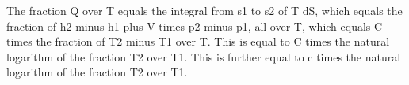 The fraction Q over T equals the integral from s1 to s2 of T dS, which equals the fraction of h2 minus h1 plus V times p2 minus p1, all over T, which equals C times the fraction of T2 minus T1 over T. This is equal to C times the natural logarithm of the fraction T2 over T1. This is further equal to c times the natural logarithm of the fraction T2 over T1.